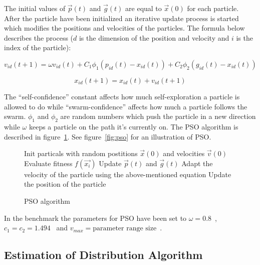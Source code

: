 The initial values of $\vec{p}(t)$ and $\vec{g}(t)$ are equal to $\vec{x}(0)$ for each particle. After the particle have been initialized an iterative update process is started which modifies the positions and velocities of the particles. The formula below describes the process ($d$ is the dimension of the position and velocity and $i$ is the index of the particle):

\begin{equation}
  v_{id} (t+1) = \omega v_{id} (t) + C_1 \phi_1 (p_{id} (t) - x_{id} (t)) + C_2 \phi_2 (g_{id} (t) - x_{id} (t))
\end{equation}

\begin{equation}
  x_{id} (t+1) = x_{id} (t) + v_{id} (t+1)
\end{equation}

The “self-confidence” constant affects how much self-exploration a particle is allowed to do while “swarm-confidence” affects how much a particle follows the swarm. $\phi_1$ and $\phi_2$ are random numbers which push the particle in a new direction while $\omega$ keeps a particle on the path it’s currently on. The PSO algorithm is described in figure~\ref{algo:pso}. See figure~\ref{fig:pso} for an illustration of PSO.

\begin{figure}[h]
  \centering
  \begin{minipage}{12.5cm}
    \begin{algorithmic}
      \State Init particals with random postitions
      $\vec{x}(0)$ and velocities $\vec{v}(0)$
      \Repeat
          \State Evaluate fitness $f(\vec{x_i})$
          \State Update $\vec{p}(t)$ and $\vec{g}(t)$
          \State Adapt the velocity of the particle using the above-mentioned equation
          \State Update the position of the particle
        \EndFor
    \end{algorithmic}
  \end{minipage}
  \caption{PSO algorithm}
  \label{algo:pso}
\end{figure}



In the benchmark the parameters for PSO have been set to $\omega = 0.8$~\cite{shi1998modified}, $c_1 = c_2 = 1.494$~\cite{kennedy1999small} and $v_{max} = \text{parameter range size}$~\cite{Das2008}.

\subsection{Estimation of Distribution Algorithm}

